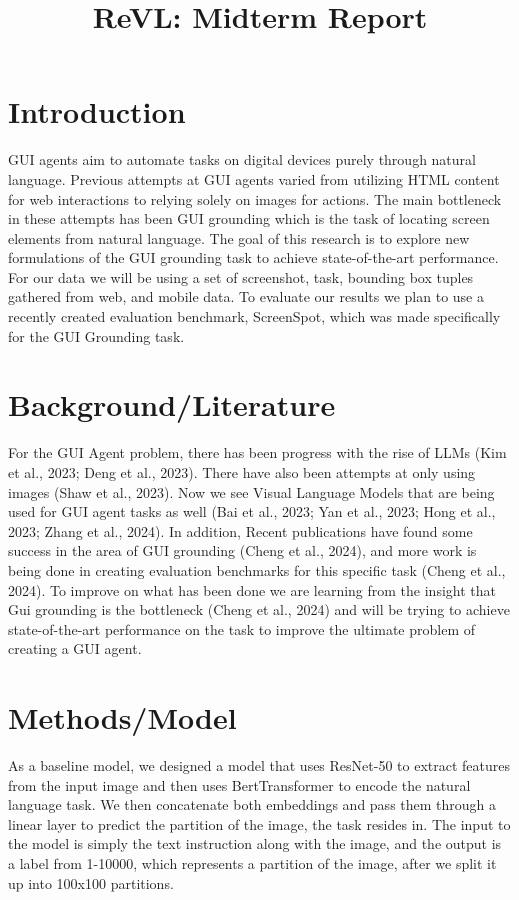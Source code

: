 \documentclass{article}
\title{ReVL: Midterm Report}
\begin{document}
\maketitle

\section{Introduction}

GUI agents aim to automate tasks on digital devices purely through natural language. Previous attempts at GUI agents varied from utilizing HTML content for web interactions to relying solely on images for actions. The main bottleneck in these attempts has been GUI grounding which is the task of locating screen elements from natural language. The goal of this research is to explore new formulations of the GUI grounding task to achieve state-of-the-art performance. For our data we will be using a set of screenshot, task, bounding box tuples gathered from web, and mobile data. To evaluate our results we plan to use a recently created evaluation benchmark, ScreenSpot, which was made specifically for the GUI Grounding task.


\section{Background/Literature}
For the GUI Agent problem, there has been progress with the rise of LLMs (Kim et al., 2023; Deng et al., 2023). There have also been attempts at only using images (Shaw et al., 2023). Now we see Visual Language Models that are being used for GUI agent tasks as well (Bai et al., 2023; Yan et al., 2023; Hong et al., 2023; Zhang et al., 2024). In addition, Recent publications have found some success in the area of GUI grounding (Cheng et al., 2024), and more work is being done in creating evaluation benchmarks for this specific task (Cheng et al., 2024). To improve on what has been done we are learning from the insight that Gui grounding is the bottleneck (Cheng et al., 2024) and will be trying to achieve state-of-the-art performance on the task to improve the ultimate problem of creating a GUI agent.

\section{Methods/Model}
As a baseline model, we designed a model that uses ResNet-50 to extract features from the input image and then uses BertTransformer to encode the natural language task. We then concatenate both embeddings and pass them through a linear layer to predict the partition of the image, the task resides in. The input to the model is simply the text instruction along with the image, and the output is a label from 1-10000, which represents a partition of the image, after we split it up into 100x100 partitions.
\end{document}
